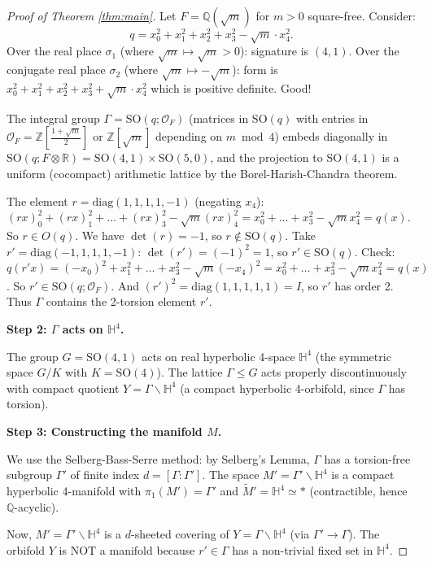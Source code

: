 \documentclass[12pt]{article}
\theoremstyle{definition}
\begin{document}
\begin{proof}[Proof of Theorem \ref{thm:main}]
Let $F = \mathbb{Q}(\sqrt{m})$ for $m > 0$ square-free. Consider:
$$q = x_0^2+x_1^2+x_2^2+x_3^2 - \sqrt{m}\cdot x_4^2.$$
Over the real place $\sigma_1$ (where $\sqrt{m}\mapsto\sqrt{m} > 0$): signature is $(4,1)$.
Over the conjugate real place $\sigma_2$ (where $\sqrt{m}\mapsto -\sqrt{m}$): form is $x_0^2+x_1^2+x_2^2+x_3^2+\sqrt{m}\cdot x_4^2$ which is positive definite. Good!

The integral group $\Gamma = \mathrm{SO}(q;\mathcal{O}_F)$ (matrices in $\mathrm{SO}(q)$ with entries in $\mathcal{O}_F = \mathbb{Z}[\frac{1+\sqrt{m}}{2}]$ or $\mathbb{Z}[\sqrt{m}]$ depending on $m\bmod 4$) embeds diagonally in $\mathrm{SO}(q;F\otimes\mathbb{R}) = \mathrm{SO}(4,1)\times\mathrm{SO}(5,0)$, and the projection to $\mathrm{SO}(4,1)$ is a uniform (cocompact) arithmetic lattice by the Borel-Harish-Chandra theorem.

The element $r = \mathrm{diag}(1,1,1,1,-1)$ (negating $x_4$): $(r x)_0^2+(r x)_1^2+\ldots +(rx)_3^2 - \sqrt{m}(rx)_4^2 = x_0^2+\ldots+x_3^2-\sqrt{m}x_4^2 = q(x)$. So $r\in O(q)$. We have $\det(r) = -1$, so $r\notin\mathrm{SO}(q)$. Take $r' = \mathrm{diag}(-1,1,1,1,-1)$: $\det(r') = (-1)^2 = 1$, so $r'\in\mathrm{SO}(q)$. Check: $q(r'x) = (-x_0)^2+x_1^2+\ldots+x_3^2-\sqrt{m}(-x_4)^2 = x_0^2+\ldots+x_3^2-\sqrt{m}x_4^2 = q(x)$. So $r'\in\mathrm{SO}(q;\mathcal{O}_F)$. And $(r')^2 = \mathrm{diag}(1,1,1,1,1) = I$, so $r'$ has order 2. Thus $\Gamma$ contains the 2-torsion element $r'$.

\textbf{Step 2: $\Gamma$ acts on $\mathbb{H}^4$.}

The group $G = \mathrm{SO}(4,1)$ acts on real hyperbolic 4-space $\mathbb{H}^4$ (the symmetric space $G/K$ with $K = \mathrm{SO}(4)$). The lattice $\Gamma\leq G$ acts properly discontinuously with compact quotient $Y = \Gamma\backslash\mathbb{H}^4$ (a compact hyperbolic 4-orbifold, since $\Gamma$ has torsion).

\textbf{Step 3: Constructing the manifold $M$.}

We use the Selberg-Bass-Serre method: by Selberg's Lemma, $\Gamma$ has a torsion-free subgroup $\Gamma'$ of finite index $d = [\Gamma:\Gamma']$. The space $M' = \Gamma'\backslash\mathbb{H}^4$ is a compact hyperbolic 4-manifold with $\pi_1(M') = \Gamma'$ and $\tilde{M}' = \mathbb{H}^4\simeq *$ (contractible, hence $\mathbb{Q}$-acyclic).

Now, $M' = \Gamma'\backslash\mathbb{H}^4$ is a $d$-sheeted covering of $Y = \Gamma\backslash\mathbb{H}^4$ (via $\Gamma'\to\Gamma$). The orbifold $Y$ is NOT a manifold because $r'\in\Gamma$ has a non-trivial fixed set in $\mathbb{H}^4$.


\end{proof}
\end{document}
